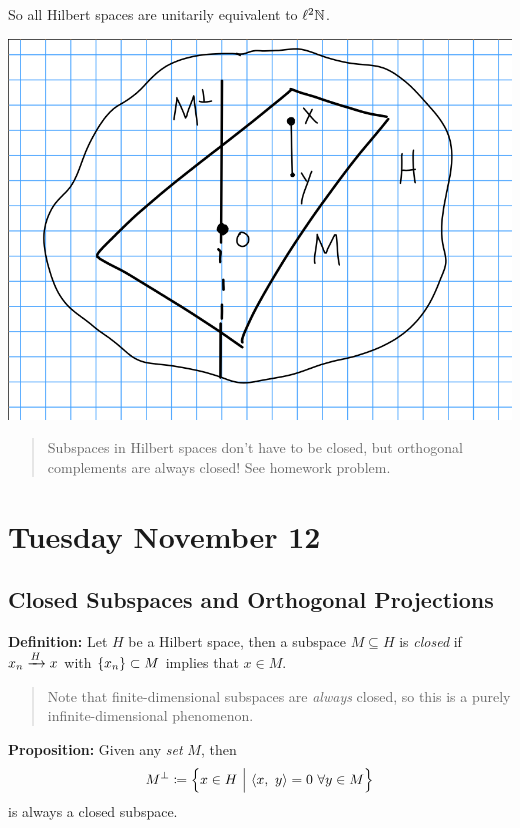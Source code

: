 So all Hilbert spaces are unitarily equivalent to \(\ell^2 {\mathbb{N}}\).

\includegraphics{figures/2019-11-07-12:22.png}\\

\begin{quote}
Subspaces in Hilbert spaces don't have to be closed, but orthogonal
complements are always closed! See homework problem.
\end{quote}

\hypertarget{tuesday-november-12}{%
\section{Tuesday November 12}\label{tuesday-november-12}}

\hypertarget{closed-subspaces-and-orthogonal-projections}{%
\subsection{Closed Subspaces and Orthogonal
Projections}\label{closed-subspaces-and-orthogonal-projections}}

\textbf{Definition:} Let \(H\) be a Hilbert space, then a subspace
\(M \subseteq H\) is \emph{closed} if \(x_n \xrightarrow{H} x\) with
\(\left\{{x_n}\right\} \subset M\) implies that \(x\in M\).

\begin{quote}
Note that finite-dimensional subspaces are \emph{always} closed, so this
is a purely infinite-dimensional phenomenon.
\end{quote}

\textbf{Proposition:} Given any \emph{set} \(M\), then
\begin{align*}
M^\perp \coloneqq \left\{{x\in H {~\mathrel{\Big|}~} {\left\langle {x},~{y} \right\rangle} = 0 ~\forall y\in M}\right\}
\end{align*} is always a closed subspace.

